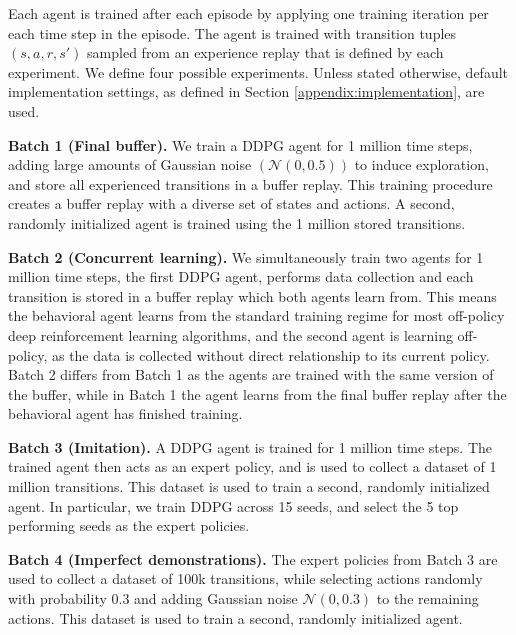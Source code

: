 \documentclass{article}
\newcommand{\N}{\mathcal{N}}
\begin{document}
Each agent is trained after each episode by applying one training iteration per each time step in the episode. The agent is trained with transition tuples $(s,a,r,s')$ sampled from an experience replay that is defined by each experiment. We define four possible experiments. Unless stated otherwise, default implementation settings, as defined in Section \ref{appendix:implementation}, are used.

\textbf{Batch 1 (Final buffer).} We train a DDPG \citep{DDPG} agent for 1 million time steps, adding large amounts of Gaussian noise $(\N(0,0.5))$ to induce exploration, and store all experienced transitions in a buffer replay. This training procedure creates a buffer replay with a diverse set of states and actions. A second, randomly initialized agent is trained using the 1 million stored transitions. 

\textbf{Batch 2 (Concurrent learning).} We simultaneously train two agents for 1 million time steps, the first DDPG agent, performs data collection and each transition is stored in a buffer replay which both agents learn from. This means the behavioral agent learns from the standard training regime for most off-policy deep reinforcement learning algorithms, and the second agent is learning off-policy, as the data is collected without direct relationship to its current policy. Batch 2 differs from Batch 1 as the agents are trained with the same version of the buffer, while in Batch 1 the agent learns from the final buffer replay after the behavioral agent has finished training.

\textbf{Batch 3 (Imitation).} A DDPG agent is trained for 1 million time steps. The trained agent then acts as an expert policy, and is used to collect a dataset of 1 million transitions. This dataset is used to train a second, randomly initialized agent. In particular, we train DDPG across 15 seeds, and select the 5 top performing seeds as the expert policies. 

\textbf{Batch 4 (Imperfect demonstrations). } The expert policies from Batch 3 are used to collect a dataset of 100k transitions, while selecting actions randomly with probability $0.3$ and adding Gaussian noise $\N(0,0.3)$ to the remaining actions. This dataset is used to train a second, randomly initialized agent. 
\end{document}
